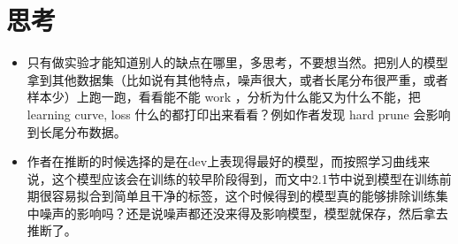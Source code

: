 \documentclass{article}
\begin{document}
\section{思考}

\begin{itemize}
    \item 只有做实验才能知道别人的缺点在哪里，多思考，不要想当然。把别人的模型拿到其他数据集（比如说有其他特点，噪声很大，或者长尾分布很严重，或者样本少）上跑一跑，看看能不能 work ，分析为什么能又为什么不能，把 learning curve, loss 什么的都打印出来看看？例如作者发现 hard prune 会影响到长尾分布数据。
    \item 作者在推断的时候选择的是在dev上表现得最好的模型，而按照学习曲线来说，这个模型应该会在训练的较早阶段得到，而文中2.1节中说到模型在训练前期很容易拟合到简单且干净的标签，这个时候得到的模型真的能够排除训练集中噪声的影响吗？还是说噪声都还没来得及影响模型，模型就保存，然后拿去推断了。
\end{itemize}
\end{document}
